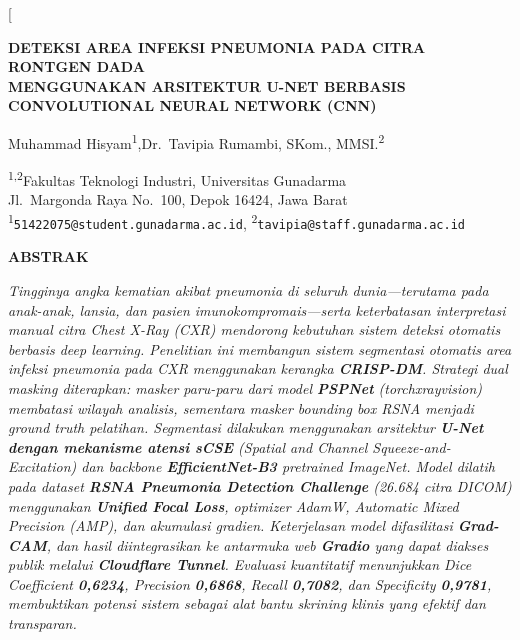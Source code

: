 \documentclass[12pt,a4paper,twocolumn]{article}
\begin{document}
\twocolumn[
\begin{@twocolumnfalse}
\begin{center}

{\bfseries DETEKSI AREA INFEKSI PNEUMONIA PADA CITRA RONTGEN DADA \\
MENGGUNAKAN ARSITEKTUR U-NET BERBASIS CONVOLUTIONAL NEURAL NETWORK (CNN)}

\vspace{12pt}

{\normalsize
Muhammad Hisyam\textsuperscript{1},\quad Dr.\ Tavipia Rumambi, SKom., MMSI.\textsuperscript{2}
}

\vspace{8pt}

{\small
\textsuperscript{1,2}Fakultas Teknologi Industri, Universitas Gunadarma\\
Jl.\ Margonda Raya No.\ 100, Depok 16424, Jawa Barat\\[4pt]
\textsuperscript{1}\texttt{51422075@student.gunadarma.ac.id},\quad
\textsuperscript{2}\texttt{tavipia@staff.gunadarma.ac.id}
}

\vspace{16pt}

\begin{minipage}{0.85\textwidth}
\begin{center}
    {\normalsize\bfseries ABSTRAK}
\end{center}
\vspace{-14pt}
{\footnotesize\itshape\singlespacing
Tingginya angka kematian akibat pneumonia di seluruh dunia---terutama
pada anak-anak, lansia, dan pasien imunokompromais---serta keterbatasan
interpretasi manual citra \textit{Chest X-Ray} (CXR) mendorong kebutuhan
sistem deteksi otomatis berbasis \textit{deep learning}. Penelitian ini
membangun sistem segmentasi otomatis area infeksi pneumonia pada CXR
menggunakan kerangka \textbf{CRISP-DM}. Strategi \textit{dual masking}
diterapkan: masker paru-paru dari model \textbf{PSPNet}
(\textit{torchxrayvision}) membatasi wilayah analisis, sementara masker
bounding box RSNA menjadi \textit{ground truth} pelatihan. Segmentasi
dilakukan menggunakan arsitektur \textbf{U-Net dengan mekanisme atensi
sCSE} (\textit{Spatial and Channel Squeeze-and-Excitation}) dan
\textit{backbone} \textbf{EfficientNet-B3} \textit{pretrained} ImageNet.
Model dilatih pada dataset \textbf{RSNA Pneumonia Detection Challenge}
(26.684 citra DICOM) menggunakan \textbf{Unified Focal Loss}, optimizer
AdamW, \textit{Automatic Mixed Precision} (AMP), dan akumulasi gradien.
Keterjelasan model difasilitasi \textbf{Grad-CAM}, dan hasil diintegrasikan
ke antarmuka web \textbf{Gradio} yang dapat diakses publik melalui
\textbf{Cloudflare Tunnel}. Evaluasi kuantitatif menunjukkan \textit{Dice
Coefficient} \textbf{0,6234}, \textit{Precision} \textbf{0,6868},
\textit{Recall} \textbf{0,7082}, dan \textit{Specificity} \textbf{0,9781},
membuktikan potensi sistem sebagai alat bantu skrining klinis yang efektif
dan transparan.
\par}


\end{minipage}
\end{center}
\end{@twocolumnfalse}
\end{document}
